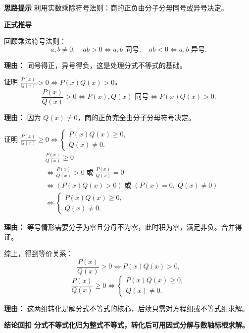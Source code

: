 \begin{proofbox}
	\textbf{\textcolor{CProof}{思路提示}}
	利用实数乘除符号法则：商的正负由分子分母同号或异号决定。

	\medskip
	\textbf{\textcolor{CProof}{正式推导}}
	\begin{description}[style=nextline, leftmargin=2.8em, labelsep=0.5em, itemsep=0.55em]
		\item[\textbf{步骤一（符号法则）：}]
		      回顾乘法符号法则：
		      \[
			      a,b\neq 0,\quad ab>0 \iff a,b \text{ 同号},\quad ab<0 \iff a,b \text{ 异号}.
		      \]
		      \par\textbf{理由：} 同号得正，异号得负，这是处理分式不等式的基础。
		\item[\textbf{步骤二（正商转化）：}]
		      证明 $\displaystyle\frac{P(x)}{Q(x)}>0\iff P(x)Q(x)>0$。
		      \[
			      \frac{P(x)}{Q(x)}>0 \iff P(x),Q(x)\text{ 同号}\iff P(x)Q(x)>0.
		      \]
		      \par\textbf{理由：} 因为 $Q(x)\neq 0$，商的正负完全由分子分母符号决定。
		\item[\textbf{步骤三（非负转化）：}]
		      证明 $\displaystyle\frac{P(x)}{Q(x)}\ge 0\iff
			      \begin{cases}
				      P(x)Q(x)\ge 0, \\ Q(x)\neq 0.
			      \end{cases}
		      $
		      \[
			      \begin{aligned}
				       & \frac{P(x)}{Q(x)}\ge 0                                    \\
				       & \iff \frac{P(x)}{Q(x)}>0 \;\text{或}\; \frac{P(x)}{Q(x)}=0 \\
				       & \iff (P(x)Q(x)>0) \;\text{或}\; (P(x)=0,\;Q(x)\neq 0)      \\
				       & \iff
				      \begin{cases}
					      P(x)Q(x)\ge 0, \\ Q(x)\neq 0.
				      \end{cases}
			      \end{aligned}
		      \]
		      \par\textbf{理由：} 等号情形需要分子为零且分母不为零，此时积为零，满足非负。合并得证。
		\item[\textbf{步骤四（总结转化）：}]
		      综上，得到等价关系：
		      \[
			      \frac{P(x)}{Q(x)}>0 \iff P(x)Q(x)>0,
		      \]
		      \[
			      \frac{P(x)}{Q(x)}\ge 0 \iff
			      \begin{cases}
				      P(x)Q(x)\ge 0, \\ Q(x)\neq 0.
			      \end{cases}
		      \]
		      \par\textbf{理由：} 这两组转化是解分式不等式的核心，后续只需对方程组或不等式组求解。
	\end{description}

	\medskip
	\textbf{\textcolor{CProof}{结论回扣}}
	\textbf{分式不等式化归为整式不等式，转化后可用因式分解与数轴标根求解。}
\end{proofbox}